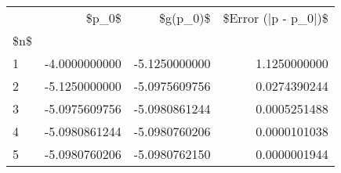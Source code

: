 \begin{tabular}{lrrr}
\toprule
{} &         \$p\_0\$ &      \$g(p\_0)\$ &  \$Error (|p - p\_0|)\$ \\
\$n\$ &               &               &                      \\
\midrule
1   & -4.0000000000 & -5.1250000000 &         1.1250000000 \\
2   & -5.1250000000 & -5.0975609756 &         0.0274390244 \\
3   & -5.0975609756 & -5.0980861244 &         0.0005251488 \\
4   & -5.0980861244 & -5.0980760206 &         0.0000101038 \\
5   & -5.0980760206 & -5.0980762150 &         0.0000001944 \\
\bottomrule
\end{tabular}
